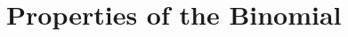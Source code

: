 \documentclass{article}
\begin{document}

    
    
    

\section{Properties of the Binomial}
\end{document}

